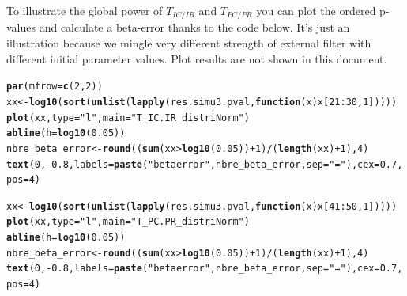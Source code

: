 \documentclass[12pt]{article}\usepackage[]{graphicx}\usepackage[]{color}
\makeatletter
\newcommand{\hlnum}[1]{\textcolor[rgb]{0.686,0.059,0.569}{#1}}%
\newcommand{\hlstr}[1]{\textcolor[rgb]{0.192,0.494,0.8}{#1}}%
\newcommand{\hlopt}[1]{\textcolor[rgb]{0,0,0}{#1}}%
\newcommand{\hlstd}[1]{\textcolor[rgb]{0.345,0.345,0.345}{#1}}%
\newcommand{\hlkwa}[1]{\textcolor[rgb]{0.161,0.373,0.58}{\textbf{#1}}}%
\newcommand{\hlkwb}[1]{\textcolor[rgb]{0.69,0.353,0.396}{#1}}%
\newcommand{\hlkwc}[1]{\textcolor[rgb]{0.333,0.667,0.333}{#1}}%
\newcommand{\hlkwd}[1]{\textcolor[rgb]{0.737,0.353,0.396}{\textbf{#1}}}%
\newenvironment{kframe}{%
 \def\at@end@of@kframe{}%
 \ifinner\ifhmode%
  \def\at@end@of@kframe{\end{minipage}}%
  \begin{minipage}{\columnwidth}%
 \fi\fi%
 \def\FrameCommand##1{\hskip\@totalleftmargin \hskip-\fboxsep
 \colorbox{shadecolor}{##1}\hskip-\fboxsep
     \hskip-\linewidth \hskip-\@totalleftmargin \hskip\columnwidth}%
 \MakeFramed {\advance\hsize-\width
   \@totalleftmargin\z@ \linewidth\hsize
   \@setminipage}}%
 {\par\unskip\endMakeFramed%
 \at@end@of@kframe}
\newenvironment{knitrout}{}{} %
\makeatother
\begin{document}
To illustrate the global power of $T_{IC/IR}$ and $T_{PC/PR}$ you can plot the ordered p-values and calculate a beta-error thanks to the code below. It's just an illustration because we mingle very different strength of external filter with different initial parameter values. Plot results are not shown in this document. 
 
\begin{knitrout}\small
{}\color{fgcolor}\begin{kframe}
\begin{alltt}
\hlkwd{par}\hlstd{(}\hlkwc{mfrow} \hlstd{=} \hlkwd{c}\hlstd{(}\hlnum{2}\hlstd{,} \hlnum{2}\hlstd{))}
\hlstd{xx} \hlkwb{<-} \hlkwd{log10}\hlstd{(}\hlkwd{sort}\hlstd{(}\hlkwd{unlist}\hlstd{(}\hlkwd{lapply}\hlstd{(res.simu3.pval,} \hlkwa{function}\hlstd{(}\hlkwc{x}\hlstd{) x[}\hlnum{21}\hlopt{:}\hlnum{30}\hlstd{,} \hlnum{1}\hlstd{]))))}
\hlkwd{plot}\hlstd{(xx,} \hlkwc{type} \hlstd{=} \hlstr{"l"}\hlstd{,} \hlkwc{main} \hlstd{=} \hlstr{"T_IC.IR_distriNorm"}\hlstd{)}
\hlkwd{abline}\hlstd{(}\hlkwc{h} \hlstd{=} \hlkwd{log10}\hlstd{(}\hlnum{0.05}\hlstd{))}
\hlstd{nbre_beta_error} \hlkwb{<-} \hlkwd{round}\hlstd{((}\hlkwd{sum}\hlstd{(xx}\hlopt{>}\hlkwd{log10}\hlstd{(}\hlnum{0.05}\hlstd{))}\hlopt{+}\hlnum{1}\hlstd{)}\hlopt{/}\hlstd{(}\hlkwd{length}\hlstd{(xx)}\hlopt{+}\hlnum{1}\hlstd{),} \hlnum{4}\hlstd{)}
\hlkwd{text}\hlstd{(}\hlnum{0}\hlstd{,} \hlopt{-}\hlnum{0.8}\hlstd{,} \hlkwc{labels} \hlstd{=} \hlkwd{paste}\hlstd{(}\hlstr{"beta error"}\hlstd{, nbre_beta_error,} \hlkwc{sep} \hlstd{=} \hlstr{" = "}\hlstd{),} \hlkwc{cex} \hlstd{=} \hlnum{0.7}\hlstd{,} \hlkwc{pos} \hlstd{=} \hlnum{4}\hlstd{)}

\hlstd{xx} \hlkwb{<-} \hlkwd{log10}\hlstd{(}\hlkwd{sort}\hlstd{(}\hlkwd{unlist}\hlstd{(}\hlkwd{lapply}\hlstd{(res.simu3.pval,} \hlkwa{function}\hlstd{(}\hlkwc{x}\hlstd{) x[}\hlnum{41}\hlopt{:}\hlnum{50}\hlstd{,} \hlnum{1}\hlstd{]))))}
\hlkwd{plot}\hlstd{(xx,} \hlkwc{type} \hlstd{=} \hlstr{"l"}\hlstd{,} \hlkwc{main} \hlstd{=} \hlstr{"T_PC.PR_distriNorm"}\hlstd{)}
\hlkwd{abline}\hlstd{(}\hlkwc{h} \hlstd{=} \hlkwd{log10}\hlstd{(}\hlnum{0.05}\hlstd{))}
\hlstd{nbre_beta_error} \hlkwb{<-} \hlkwd{round}\hlstd{((}\hlkwd{sum}\hlstd{(xx}\hlopt{>}\hlkwd{log10}\hlstd{(}\hlnum{0.05}\hlstd{))}\hlopt{+}\hlnum{1}\hlstd{)}\hlopt{/}\hlstd{(}\hlkwd{length}\hlstd{(xx)}\hlopt{+}\hlnum{1}\hlstd{),} \hlnum{4}\hlstd{)}
\hlkwd{text}\hlstd{(}\hlnum{0}\hlstd{,} \hlopt{-}\hlnum{0.8}\hlstd{,} \hlkwc{labels} \hlstd{=} \hlkwd{paste}\hlstd{(}\hlstr{"beta error"}\hlstd{, nbre_beta_error,} \hlkwc{sep} \hlstd{=} \hlstr{" = "}\hlstd{),} \hlkwc{cex} \hlstd{=} \hlnum{0.7}\hlstd{,} \hlkwc{pos} \hlstd{=} \hlnum{4}\hlstd{)}



\end{alltt}
\end{kframe}
\end{knitrout}
\end{document}
